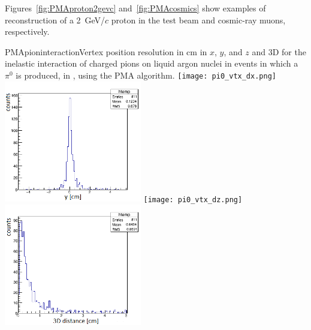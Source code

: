 Figures~\ref{fig:PMAproton2gevc}
and~\ref{fig:PMAcosmics} show examples of reconstruction of a 2~GeV/$c$ proton in the test beam and
cosmic-ray muons, respectively.

\begin{cdrfigure}{PMApioninteraction}{Vertex position resolution in cm in $x$, $y$, and $z$ and 3D for the
  inelastic interaction of charged pions on liquid argon nuclei in events in which a $\pi^0$ is produced, in
  \pdsp, using the PMA algorithm.}
\texttt{[image: pi0\_vtx\_dx.png]}\includegraphics[width=0.45\textwidth]{figures/pi0_vtx_dy.png}
\texttt{[image: pi0\_vtx\_dz.png]}\includegraphics[width=0.45\textwidth]{figures/pi0_vtx3d.png}
\end{cdrfigure}



